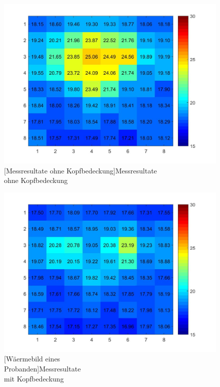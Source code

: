 \begin{figure}[!ht]
	\centering
	\begin{minipage}[b]{0.49\linewidth}
		\centering	
		\includegraphics[width=1.0\linewidth]{fig/person_175_shirt.jpg}
		[Messresultate ohne Kopfbedeckung]{Messresultate\\ ohne Kopfbedeckung}
		\label{fig:ohneHut}
	\end{minipage}
	\hfill
	\begin{minipage}[b]{0.49\linewidth}
		\centering
		\includegraphics[width=1.0\linewidth]{fig/person_175_kopfbedeckung.jpg}
		[Wäermebild eines\\Probanden]{Messresultate\\ mit Kopfbedeckung}
		\label{fig:mitHut}	
	\end{minipage}
\end{figure}

